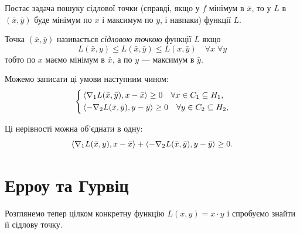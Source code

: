 Постає задача пошуку сідлової точки (справді, якщо у $f$ мінімум в $\bar x$, то у $L$ в $(\bar x, \bar y)$ буде мінімум по $x$ і максимум по $y$, і навпаки) функції $L$. 

\begin{definition}
    Точка $(\bar x, \bar y)$ називається \emph{сідловою точкою} функції $L$ якщо
    \begin{equation}
        L(\bar x, y) \le L(\bar x, \bar y) \le L(x, \bar y) \quad \forall x \; \forall y
    \end{equation}
    тобто по $x$ маємо мінімум в $\bar x$, а по $y$ --- максимум в $\bar y$.
\end{definition}

Можемо записати ці умови наступним чином:
\begin{equation}
    \left\{
        \begin{aligned}
            & \sp{\nabla_1 L(\bar x, \bar y), x - \bar x} \ge 0 \quad \forall x \in C_1 \subseteq H_1, \\
            & \sp{-\nabla_2 L(\bar x, \bar y), y - \bar y} \ge 0 \quad \forall y \in C_2 \subseteq H_2,
        \end{aligned}
    \right. 
\end{equation}

\begin{remark}
    Ці нерівності можна об'єднати в одну:
    \begin{equation}
        \sp{\nabla_1 L(\bar x, y), x - \bar x} + \sp{-\nabla_2 L(\bar x, \bar y), y - \bar y} \ge 0.
    \end{equation}
\end{remark}

\section{Ерроу та Гурвіц}

\begin{example}
    Розглянемо тепер цілком конкретну функцію $L(x, y) = x \cdot y$ і спробуємо знайти її сідлову точку.
\end{example}


